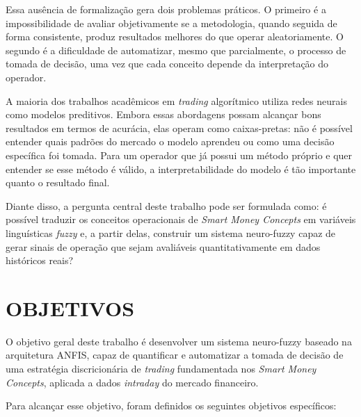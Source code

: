 Essa ausência de formalização gera dois problemas práticos. O primeiro é a impossibilidade de avaliar objetivamente se a metodologia, quando seguida de forma consistente, produz resultados melhores do que operar aleatoriamente. O segundo é a dificuldade de automatizar, mesmo que parcialmente, o processo de tomada de decisão, uma vez que cada conceito depende da interpretação do operador.

A maioria dos trabalhos acadêmicos em \textit{trading} algorítmico utiliza redes neurais como modelos preditivos. Embora essas abordagens possam alcançar bons resultados em termos de acurácia, elas operam como caixas-pretas: não é possível entender quais padrões do mercado o modelo aprendeu ou como uma decisão específica foi tomada. Para um operador que já possui um método próprio e quer entender se esse método é válido, a interpretabilidade do modelo é tão importante quanto o resultado final.

Diante disso, a pergunta central deste trabalho pode ser formulada como: é possível traduzir os conceitos operacionais de \textit{Smart Money Concepts} em variáveis linguísticas \textit{fuzzy} e, a partir delas, construir um sistema neuro-fuzzy capaz de gerar sinais de operação que sejam avaliáveis quantitativamente em dados históricos reais?


\section{\uppercase{Objetivos}}

O objetivo geral deste trabalho é desenvolver um sistema neuro-fuzzy baseado na arquitetura ANFIS, capaz de quantificar e automatizar a tomada de decisão de uma estratégia discricionária de \textit{trading} fundamentada nos \textit{Smart Money Concepts}, aplicada a dados \textit{intraday} do mercado financeiro.

Para alcançar esse objetivo, foram definidos os seguintes objetivos específicos:

